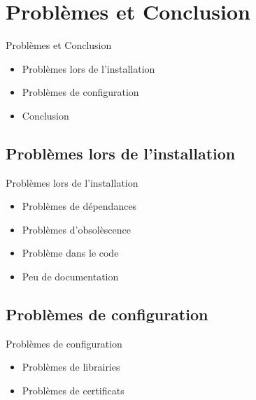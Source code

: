 \documentclass[t,12pt]{beamer}
\begin{document}
\section{Problèmes et Conclusion}                                                    %
\begin{frame}{Problèmes et Conclusion}                                                         %
    \begin{itemize}                                                   %
	\item Problèmes lors de l'installation
	\item Problèmes de configuration
	\item Conclusion
\end{itemize}
\end{frame}                                                            %
	\subsection{Problèmes lors de l'installation}
		\begin{frame}{Problèmes lors de l'installation}                    %
		\begin{itemize}
			\item Problèmes de dépendances
			\newline
			\item Problèmes d'obsolèscence
			\newline		
			\item Problème dans le code
			\newline
			\item Peu de documentation
		\end{itemize}
		\end{frame}

	\subsection{Problèmes de configuration}
		\begin{frame}{Problèmes de configuration}                        %
		\begin{itemize}
			\item Problèmes de librairies
			\newline
			\newline
			\item Problèmes de certificats
		\end{itemize}
		\end{frame}
\end{document}
